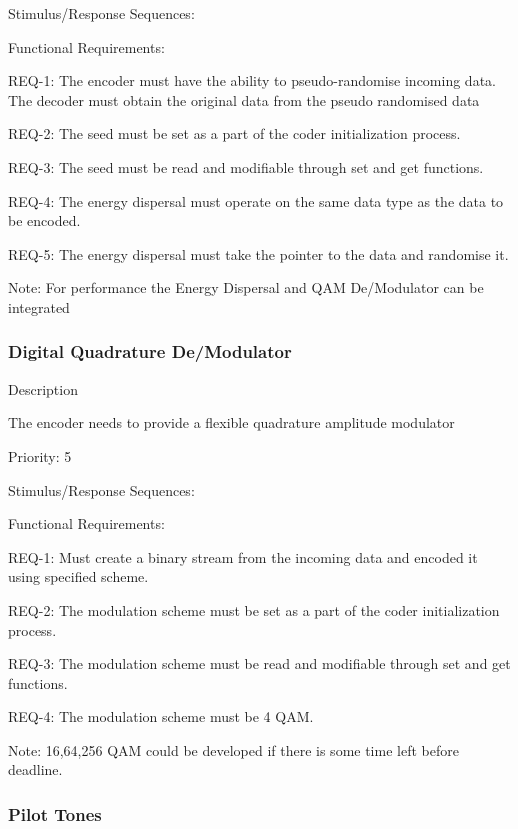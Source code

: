\documentclass[]{report}
\begin{document}
Stimulus/Response Sequences: \par


Functional Requirements: \par

REQ-1: The encoder must have the ability to pseudo-randomise incoming data. The decoder must obtain the original data from the pseudo randomised data \par
REQ-2: The seed must be set as a part of the coder initialization process. \par
REQ-3: The seed must be read and modifiable through set and get functions. \par
REQ-4: The energy dispersal must operate on the same data type as the data to be encoded. \par
REQ-5: The energy dispersal must take the pointer to the data and randomise it. \par

Note: For performance the Energy Dispersal and QAM De/Modulator can be integrated 

\subsubsection{Digital Quadrature De/Modulator }

Description \par
The encoder needs to provide a flexible quadrature amplitude modulator \par
Priority: 5

Stimulus/Response Sequences: \par 

Functional Requirements: \par

REQ-1: Must create a binary stream from the incoming data and encoded it using specified scheme. \par
REQ-2: The modulation scheme must be set as a part of the coder initialization process. \par
REQ-3: The modulation scheme must be read and modifiable through set and get functions. \par
REQ-4: The modulation scheme must be 4 QAM. \par

Note: 16,64,256 QAM could be developed if there is some time left before deadline.

\subsubsection{Pilot Tones}
\end{document}
